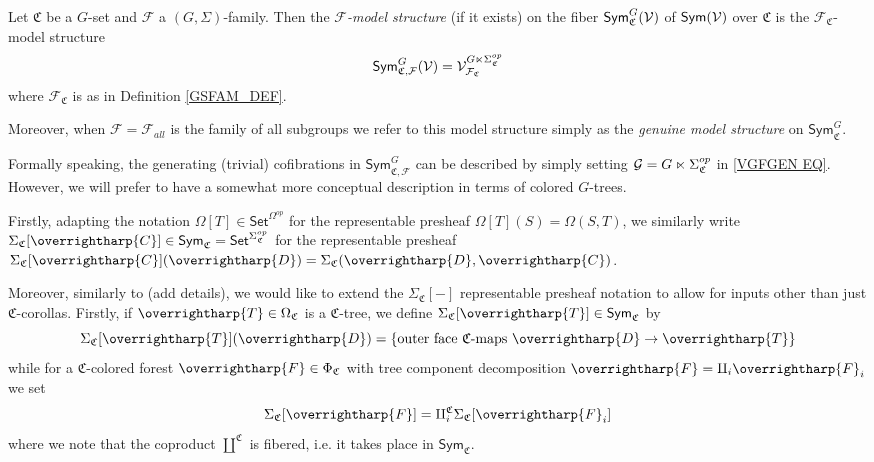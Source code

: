 \documentclass[a4paper,10pt
,draft
]{article}%
\renewcommand{\F}{\mathcal F}
\renewcommand{\1}{\eta}%
\newcommand{\vect}[1]{\text{\overrightharp{\ensuremath{#1}}}}
\begin{document}
\begin{definition}\label{SYMGFV DEF}
Let $\mathfrak C$ be a $G$-set and $\F$ a $(G, \Sigma)$-family.
Then the \textit{$\F$-model structure} (if it exists) on the fiber $\mathsf{Sym}^{G}_{\mathfrak C}(\mathcal V)$ of $\mathsf{Sym}(\mathcal V)$ over $\mathfrak C$
is the $\F_{\mathfrak{C}}$-model structure
\begin{equation}
	\Sym^{G}_{\mathfrak{C},\F}(\V) = \V^{G \ltimes \Sigma_{\mathfrak C}^{op}}_{\F_{\mathfrak{C}}}
\end{equation}
where $\F_{\mathfrak{C}}$ is as in Definition \ref{GSFAM_DEF}.

Moreover, when $\mathcal{F}=\mathcal{F}_{all}$ is the family of all subgroups we refer to this model structure simply as the \emph{genuine model structure} on $\mathsf{Sym}^G_{\mathfrak{C}}$.
\end{definition}



Formally speaking, the generating (trivial) cofibrations in 
$\mathsf{Sym}^G_{\mathfrak{C},\mathcal{F}}$
can be described by simply setting 
$\mathcal{G} = G \ltimes \Sigma^{op}_{\mathfrak{C}}$ in \eqref{VGFGEN EQ}.
However, we will prefer to have a somewhat more conceptual description in terms of colored $G$-trees.

Firstly, adapting the notation 
$\Omega[T] \in \mathsf{Set}^{\Omega^{op}}$
for the representable presheaf $\Omega[T](S) = \Omega(S,T)$,
we similarly write
$\Sigma_{\mathfrak{C}}[\vect{C}] 
\in \mathsf{Sym}_{\mathfrak{C}} = \mathsf{Set}^{\Sigma_{\mathfrak{C}}^{op}}$ for the representable presheaf
$\Sigma_{\mathfrak{C}}[\vect{C}](\vect{D})
= \Sigma_{\mathfrak{C}}(\vect{D},\vect{C})$.

Moreover, similarly to {\color{blue} \cite{BP_edss} (add details)},
we would like to extend the
$\Sigma_{\mathfrak{C}}[-]$ representable presheaf notation
to allow for inputs other than just $\mathfrak{C}$-corollas.
Firstly, if $\vect{T} \in \Omega_{\mathfrak{C}}$ is a $\mathfrak{C}$-tree, we define 
$\Sigma_{\mathfrak{C}}[\vect{T}] \in \mathsf{Sym}_{\mathfrak{C}}$
by
\[
\Sigma_{\mathfrak{C}}[\vect{T}](\vect{D})
=\{ \text{outer face $\mathfrak{C}$-maps } \vect{D} \to \vect{T}\}
\]
while for a $\mathfrak{C}$-colored forest
$\vect{F} \in \Phi_{\mathfrak{C}}$
with tree component decomposition
$\vect{F} = \amalg_i \vect{F}_i$
we set
\[
\Sigma_{\mathfrak{C}}[\vect{F}] =
\amalg^{\mathfrak{C}}_i 
\Sigma_{\mathfrak{C}}[\vect{F}_i]
\]
where we note that the coproduct $\amalg^{\mathfrak{C}}$ is fibered, i.e. it takes place in $\mathsf{Sym}_{\mathfrak{C}}$.
\end{document}
